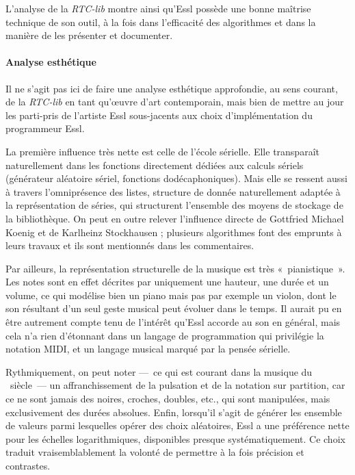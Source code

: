\documentclass[a4paper,12pt]{article}
\newcommand{\guill}[1]{«~#1~»}
\begin{document}
L'analyse de la \emph{RTC-lib} montre ainsi qu'Essl possède une bonne maîtrise technique de son outil, à la fois dans l'efficacité des algorithmes et dans la manière de les présenter et documenter.

\paragraph{Analyse esthétique \\}

Il ne s'agit pas ici de faire une analyse esthétique approfondie, au sens courant, de la \emph{RTC-lib} en tant qu'œuvre d'art contemporain, mais bien de mettre au jour les parti-pris de l'artiste Essl sous-jacents aux choix d'implémentation du programmeur Essl.

La première influence très nette est celle de l'école sérielle. Elle transparaît naturellement dans les fonctions directement dédiées aux calculs sériels (générateur aléatoire sériel, fonctions dodécaphoniques). Mais elle se ressent aussi à travers l'omniprésence des listes, structure de donnée naturellement adaptée à la représentation de séries, qui structurent l'ensemble des moyens de stockage de la bibliothèque. On peut en outre relever l'influence directe de Gottfried Michael Koenig et de Karlheinz Stockhausen ; plusieurs algorithmes font des emprunts à leurs travaux et ils sont mentionnés dans les commentaires.

Par ailleurs, la représentation structurelle de la musique est très \guill{pianistique}. Les notes sont en effet décrites par uniquement une hauteur, une durée et un volume, ce qui modélise bien un piano mais pas par exemple un violon, dont le son résultant d'un seul geste musical peut évoluer dans le temps. Il aurait pu en être autrement compte tenu de l'intérêt qu'Essl accorde au son en général, mais cela n'a rien d'étonnant dans un langage de programmation qui privilégie la notation MIDI, et un langage musical marqué par la pensée sérielle.

Rythmiquement, on peut noter ---~ce qui est courant dans la musique du \XXe~siècle~--- un affranchissement de la pulsation et de la notation sur partition, car ce ne sont jamais des noires, croches, doubles, etc., qui sont manipulées, mais exclusivement des durées absolues. Enfin, lorsqu'il s'agit de générer les ensemble de valeurs parmi lesquelles opérer des choix aléatoires, Essl a une préférence nette pour les échelles logarithmiques, disponibles presque systématiquement. Ce choix traduit vraisemblablement la volonté de permettre à la fois précision et contrastes. %
\end{document}
